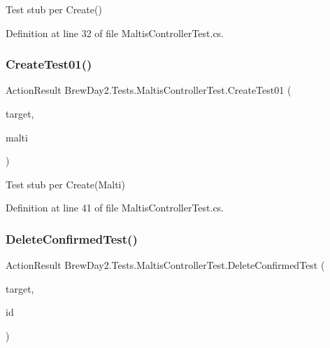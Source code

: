 Test stub per Create()



Definition at line 32 of file Maltis\+Controller\+Test.\+cs.

\mbox{\label{class_brew_day2_1_1_tests_1_1_maltis_controller_test_ad3b0dc60cf0e0d41c54b41327c7881d2}} 
\subsubsection{\texorpdfstring{Create\+Test01()}{CreateTest01()}}
{\footnotesize\ttfamily Action\+Result Brew\+Day2.\+Tests.\+Maltis\+Controller\+Test.\+Create\+Test01 (\begin{DoxyParamCaption}\item[{\mbox{[}\+Pex\+Assume\+Under\+Test\mbox{]} \mbox{\hyperlink{class_brew_day2_1_1_controllers_1_1_maltis_controller}{Maltis\+Controller}}}]{target,  }\item[{\mbox{\hyperlink{class_brew_day2_1_1_models_1_1_malti}{Malti}}}]{malti }\end{DoxyParamCaption})}



Test stub per Create(\+Malti)



Definition at line 41 of file Maltis\+Controller\+Test.\+cs.

\mbox{\label{class_brew_day2_1_1_tests_1_1_maltis_controller_test_a703230da4209f4b20ded138f7e17331b}} 
\subsubsection{\texorpdfstring{Delete\+Confirmed\+Test()}{DeleteConfirmedTest()}}
{\footnotesize\ttfamily Action\+Result Brew\+Day2.\+Tests.\+Maltis\+Controller\+Test.\+Delete\+Confirmed\+Test (\begin{DoxyParamCaption}\item[{\mbox{[}\+Pex\+Assume\+Under\+Test\mbox{]} \mbox{\hyperlink{class_brew_day2_1_1_controllers_1_1_maltis_controller}{Maltis\+Controller}}}]{target,  }\item[{int}]{id }\end{DoxyParamCaption})}



